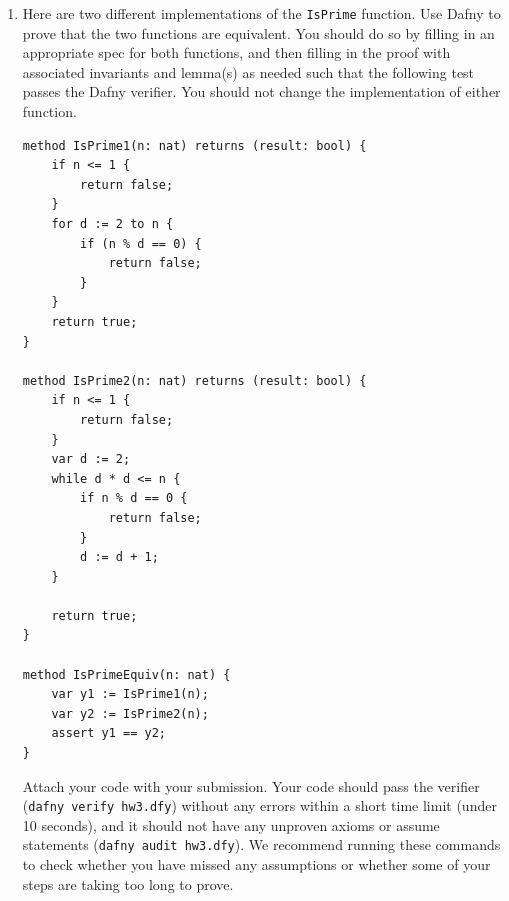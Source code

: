\documentclass{article}
\newcommand{\hoare}[3]{\{#1\} \; #2 \; \{#3\}}
\begin{document}
\begin{enumerate}
Suppose that we extend the language of programs with a \emph{case} statement that has syntax as follows:
``\texttt{case} $n_1$ $n_2$ \texttt{less =>} $C_1$ \texttt{eq =>} $C_2$ \texttt{greater =>} $C_3$''.
The statement means to compare the integer expressions $n_1$ and $n_2$, and if they are less, equal to, or greater, execute the corresponding program $C_1$, $C_2$, or $C_3$.

\begin{enumerate}[(a)]
\item Give a proof rule for the \texttt{case} statement. Your proof rule should allow proving
Hoare triples of the form $\hoare{P}{C}{Q}$ where $C$ is a case statement.
\item Show that your proof rule does not fundamentally increase the expressiveness of Hoare logic in the following sense: give an encoding of \texttt{case} statements using if-then-else,
and show that the Hoare rules for if-then-else can be used to prove your new proof rule that you provided in (a).
\end{enumerate}

\item
Here are two different implementations of the \texttt{IsPrime} function.
Use Dafny to prove that the two functions are equivalent.
You should do so by filling in an appropriate spec for both functions,
and then filling in the proof with associated invariants and lemma(s) as needed
such that the following test passes the Dafny verifier.
You should not change the implementation of either function.

\begin{verbatim}
method IsPrime1(n: nat) returns (result: bool) {
    if n <= 1 {
        return false;
    }
    for d := 2 to n {
        if (n % d == 0) {
            return false;
        }
    }
    return true;
}

method IsPrime2(n: nat) returns (result: bool) {
    if n <= 1 {
        return false;
    }
    var d := 2;
    while d * d <= n {
        if n % d == 0 {
            return false;
        }
        d := d + 1;
    }

    return true;
}

method IsPrimeEquiv(n: nat) {
    var y1 := IsPrime1(n);
    var y2 := IsPrime2(n);
    assert y1 == y2;
}
\end{verbatim}

Attach your code with your submission.
Your code should pass the verifier (\texttt{dafny verify hw3.dfy}) without any errors
within a short time limit (under 10 seconds),
and it should not have any unproven axioms or assume statements (\texttt{dafny audit hw3.dfy}).
We recommend running these commands to check whether you have missed any assumptions or whether some of your steps are taking too long to prove.


\end{enumerate}
\end{document}

